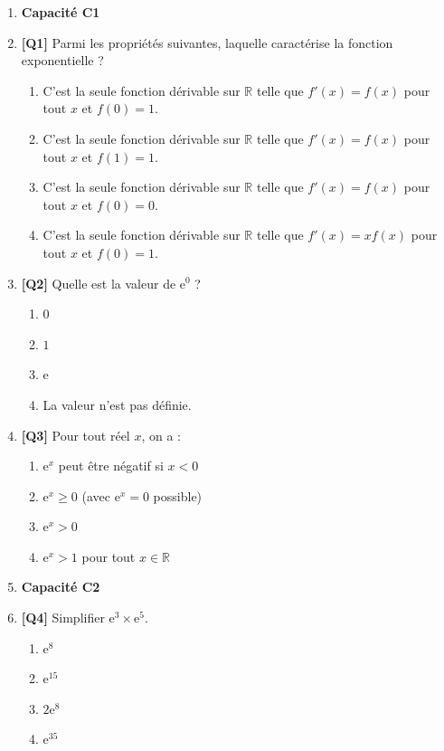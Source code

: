 \begin{enumerate}

\item[] \textbf{Capacité C1}

\item \textbf{[Q1]} Parmi les propriétés suivantes, laquelle caractérise la fonction exponentielle ?
  \begin{enumerate}[label=\Alph*.]
    \item C'est la seule fonction dérivable sur $\mathbb{R}$ telle que $f'(x) = f(x)$ pour tout $x$ et $f(0) = 1$.
    \item C'est la seule fonction dérivable sur $\mathbb{R}$ telle que $f'(x) = f(x)$ pour tout $x$ et $f(1) = 1$.
    \item C'est la seule fonction dérivable sur $\mathbb{R}$ telle que $f'(x) = f(x)$ pour tout $x$ et $f(0) = 0$.
    \item C'est la seule fonction dérivable sur $\mathbb{R}$ telle que $f'(x) = x f(x)$ pour tout $x$ et $f(0) = 1$.
  \end{enumerate}

\item \textbf{[Q2]} Quelle est la valeur de $\mathrm{e}^0$ ?
  \begin{enumerate}[label=\Alph*.]
    \item $0$
    \item $1$
    \item $\mathrm{e}$
    \item La valeur n'est pas définie.
  \end{enumerate}

\item \textbf{[Q3]} Pour tout réel $x$, on a :
  \begin{enumerate}[label=\Alph*.]
    \item $\mathrm{e}^x$ peut être négatif si $x < 0$
    \item $\mathrm{e}^x \geqslant 0$ (avec $\mathrm{e}^x = 0$ possible)
    \item $\mathrm{e}^x > 0$
    \item $\mathrm{e}^x > 1$ pour tout $x \in \mathbb{R}$
  \end{enumerate}

\item[] \textbf{Capacité C2}

\item \textbf{[Q4]} Simplifier $\mathrm{e}^3 \times \mathrm{e}^5$.
  \begin{enumerate}[label=\Alph*.]
    \item $\mathrm{e}^8$
    \item $\mathrm{e}^{15}$
    \item $2\mathrm{e}^8$
    \item $\mathrm{e}^{35}$
  \end{enumerate}


\end{enumerate}
